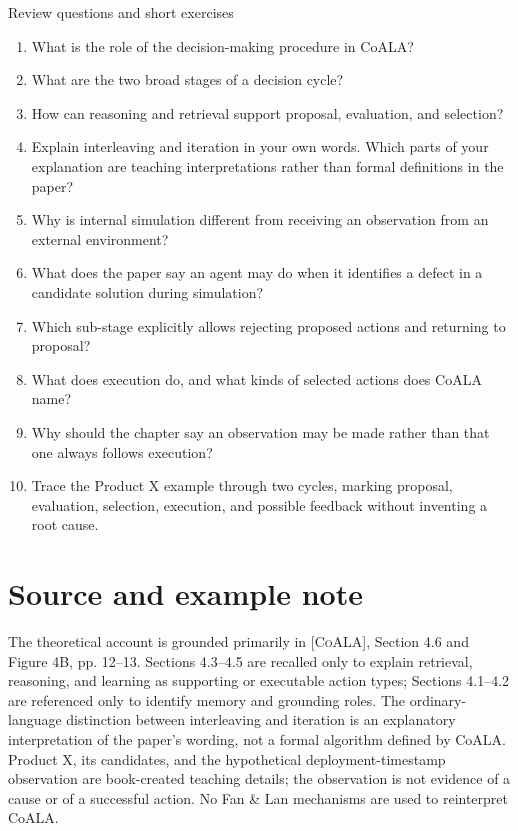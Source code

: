 \begin{reviewquestions}{Review questions and short exercises}
\begin{enumerate}
  \item What is the role of the decision-making procedure in CoALA?
  \item What are the two broad stages of a decision cycle?
  \item How can reasoning and retrieval support proposal, evaluation, and selection?
  \item Explain interleaving and iteration in your own words. Which parts of your explanation are teaching interpretations rather than formal definitions in the paper?
  \item Why is internal simulation different from receiving an observation from an external environment?
  \item What does the paper say an agent may do when it identifies a defect in a candidate solution during simulation?
  \item Which sub-stage explicitly allows rejecting proposed actions and returning to proposal?
  \item What does execution do, and what kinds of selected actions does CoALA name?
  \item Why should the chapter say an observation may be made rather than that one always follows execution?
  \item Trace the Product X example through two cycles, marking proposal, evaluation, selection, execution, and possible feedback without inventing a root cause.
\end{enumerate}
\end{reviewquestions}

\section*{Source and example note}
The theoretical account is grounded primarily in \textsc{[CoALA]}, Section 4.6 and Figure 4B, pp. 12--13. Sections 4.3--4.5 are recalled only to explain retrieval, reasoning, and learning as supporting or executable action types; Sections 4.1--4.2 are referenced only to identify memory and grounding roles. The ordinary-language distinction between interleaving and iteration is an explanatory interpretation of the paper's wording, not a formal algorithm defined by CoALA. Product X, its candidates, and the hypothetical deployment-timestamp observation are book-created teaching details; the observation is not evidence of a cause or of a successful action. No Fan \& Lan mechanisms are used to reinterpret CoALA.
